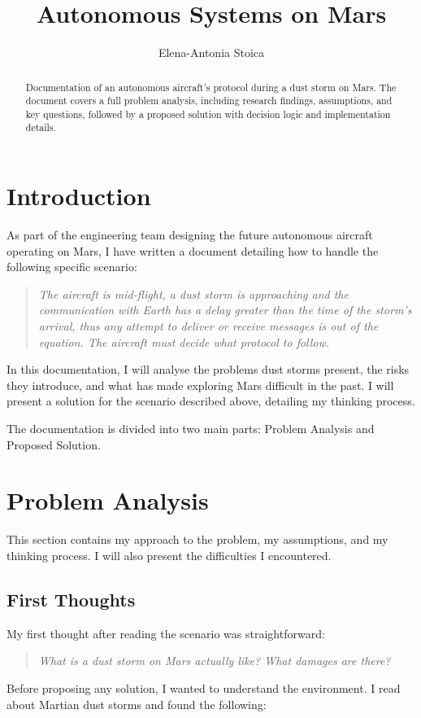 \documentclass[a4paper,12pt]{article}
\title{Autonomous Systems on Mars}
\author{Elena-Antonia Stoica}
\date{}
\begin{document}
\maketitle

\begin{abstract}
Documentation of an autonomous aircraft's protocol during a dust storm on Mars.
The document covers a full problem analysis, including research findings, assumptions,
and key questions, followed by a proposed solution with decision logic and implementation details.
\end{abstract}

\tableofcontents
\newpage

\section{Introduction}
As part of the engineering team designing the future autonomous aircraft operating on Mars,
I have written a document detailing how to handle the following specific scenario:
\vspace{-0.8em}
\begin{quote}
\textit{The aircraft is mid-flight, a dust storm is approaching and the communication with Earth
has a delay greater than the time of the storm's arrival, thus any attempt to deliver or receive messages
is out of the equation. The aircraft must decide what protocol to follow.}
\end{quote}
\vspace{-0.8em}
In this documentation, I will analyse the problems dust storms present, the risks they introduce,
and what has made exploring Mars difficult in the past. I will present a solution for the scenario
described above, detailing my thinking process.

The documentation is divided into two main parts: Problem Analysis and Proposed Solution.

\section{Problem Analysis}
This section contains my approach to the problem, my assumptions, and my thinking process.
I will also present the difficulties I encountered.

\subsection{First Thoughts}
My first thought after reading the scenario was straightforward:
\vspace{-0.8em}
\begin{quote}
\textit{What is a dust storm on Mars actually like? What damages are there?}
\end{quote}
\vspace{-0.8em}
Before proposing any solution, I wanted to understand the environment. I read about Martian
dust storms \cite{nasa_dust_storms, esa_dust_devils} and found the following:
\end{document}
